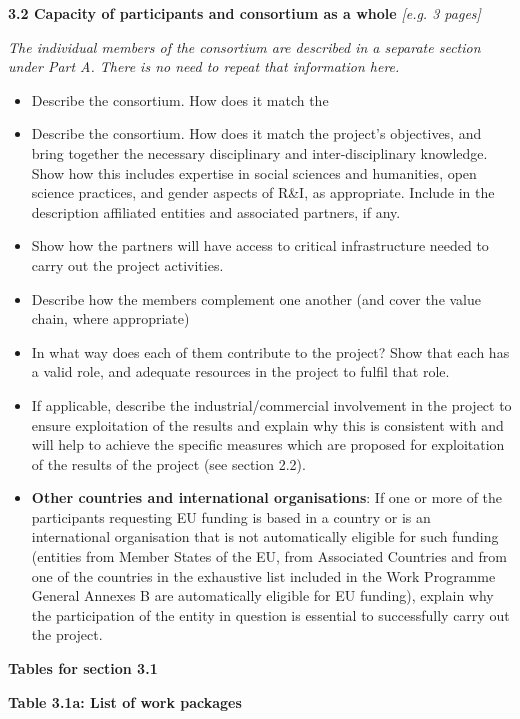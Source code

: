 \textbf{3.2 Capacity of participants and consortium as a whole
}\emph{{[}e.g. 3 pages{]} }

\emph{The individual members of the consortium are described in a
separate section under Part A. There is no need to repeat that
information here. }

\begin{itemize}
\item
  Describe the consortium. How does it match the
\item
  Describe the consortium. How does it match the project's objectives,
  and bring together the necessary disciplinary and inter-disciplinary
  knowledge. Show how this includes expertise in social sciences and
  humanities, open science practices, and gender aspects of R\&I, as
  appropriate. Include in the description affiliated entities and
  associated partners, if any.
\item
  Show how the partners will have access to critical infrastructure
  needed to carry out the project activities.
\item
  Describe how the members complement one another (and cover the value
  chain, where appropriate)
\item
  In what way does each of them contribute to the project? Show that
  each has a valid role, and adequate resources in the project to fulfil
  that role.
\item
  If applicable, describe the industrial/commercial involvement in the
  project to ensure exploitation of the results and explain why this is
  consistent with and will help to achieve the specific measures which
  are proposed for exploitation of the results of the project (see
  section 2.2).
\item
  \textbf{Other countries and international organisations}: If one or
  more of the participants requesting EU funding is based in a country
  or is an international organisation that is not automatically eligible
  for such funding (entities from Member States of the EU, from
  Associated Countries and from one of the countries in the exhaustive
  list included in the Work Programme General Annexes B are
  automatically eligible for EU funding), explain why the participation
  of the entity in question is essential to successfully carry out the
  project.
\end{itemize}

\textbf{Tables for section 3.1}

\textbf{Table 3.1a: List of work packages}

